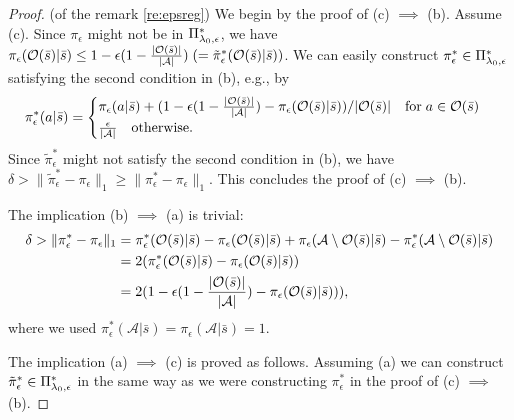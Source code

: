 \begin{proof} (of the remark \ref{re:epsreg})
We begin by the proof of 
(c) $\implies$ (b).
Assume (c).
Since $\pi_{\epsilon}$ might not be in $\Pi_{\mathit{\lambda}_0,\epsilon}^*$,
we have $\pi_{\epsilon}(\mathcal{O}(\bar{s})|\bar{s}) \leq 1-\epsilon(1-\frac{|\mathcal{O}(\bar{s})|}{|\mathcal{A}|}) \;( =  \tilde{\pi}_{\epsilon}^*(\mathcal{O}(\bar{s})|\bar{s}))$.
We can easily construct $\pi_{\epsilon}^* \in \Pi_{\mathit{\lambda}_0,\epsilon}^*$ satisfying the second condition in (b), e.g., by
$$
\pi_{\epsilon}^*(a|\bar{s}) =
\begin{cases}
\pi_{\epsilon}(a|\bar{s}) 
+
(
1-\epsilon(1-\frac{|\mathcal{O}(\bar{s})|}{|\mathcal{A}|})
-
\pi_{\epsilon}(\mathcal{O}(\bar{s})|\bar{s}) 
)/|\mathcal{O}(\bar{s})|
\quad \text{for}\; a \in \mathcal{O}(\bar{s})
\\
\frac{\epsilon}{|\mathcal{A}|}
\quad \text{otherwise}.
\end{cases}
$$
Since $\tilde{\pi}_{\epsilon}^*$ might not satisfy the
second condition in (b), we have $\delta > \|\tilde{\pi}_{\epsilon}^*-\pi_{\epsilon}\|_1 \geq \|\pi_{\epsilon}^*-\pi_{\epsilon}\|_1$. This concludes the proof of (c) $\implies$ (b).

The implication (b) $\implies$ (a) is trivial:
\begin{align*}
\delta > \|\pi_{\epsilon}^*-\pi_{\epsilon}\|_1
&= 
\pi_{\epsilon}^*(\mathcal{O}(\bar{s})|\bar{s})
- 
\pi_{\epsilon}(\mathcal{O}(\bar{s})|\bar{s})
+
\pi_{\epsilon}(\mathcal{A}\setminus \mathcal{O}(\bar{s})|\bar{s})
-
\pi_{\epsilon}^*(\mathcal{A}\setminus \mathcal{O}(\bar{s})|\bar{s}) 
\\
&=
2(\pi_{\epsilon}^*(\mathcal{O}(\bar{s})|\bar{s})
- 
\pi_{\epsilon}(\mathcal{O}(\bar{s})|\bar{s}))
\\
&=
2(
1-\epsilon(1-\frac{|\mathcal{O}(\bar{s})|}{|\mathcal{A}|})
- 
\pi_{\epsilon}(\mathcal{O}(\bar{s})|\bar{s}))
),
\end{align*}
where we used $\pi_{\epsilon}^*(\mathcal{A}|\bar{s}) = \pi_{\epsilon}(\mathcal{A}|\bar{s}) = 1$.

The implication (a) $\implies$ (c) is proved as follows.
Assuming (a) we can construct $\tilde{\pi}_{\epsilon}^* \in \Pi_{\mathit{\lambda}_0,\epsilon}^*$
in the same way as we were constructing $\pi_{\epsilon}^*$
in the proof of (c) $\implies$ (b).
\end{proof}



